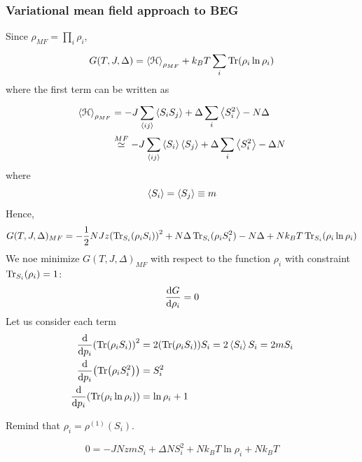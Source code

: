 \documentclass[../main/main.tex]{subfiles}
\begin{document}
\subsubsection{Variational mean field approach to BEG}
Since \( \rho _{MF} = \prod_{i}^{} \rho _i   \),
\begin{equation}
  G(T,J,\Delta ) = \expval{\mathcal{H}}_{\rho _{MF}} + k_B T \sum_{i}^{} \Tr(\rho _i \ln{\rho _i } )
\end{equation}
where the first term can be written as
\begin{equation}
\begin{split}
\expval{\mathcal{H}}_{\rho _{MF}}   &= - J \sum_{\expval{ij} }^{} \expval{S_i S_j}  + \Delta \sum_{i}^{} \expval{S_i^2} - N \Delta      \\
& \overset{MF}{\simeq } - J \sum_{\expval{ij} }^{} \expval{S_i} \expval{S_j} + \Delta \sum_{i}^{} \expval{S_i^2} - \Delta N
\end{split}
\end{equation}
where
\begin{equation}
  \expval{S_i} = \expval{S_j} \equiv m
\end{equation}
Hence,
\begin{equation}
  G(T,J, \Delta )_{MF}  = - \frac{1}{2} N J z \qty( \Tr_{S_i}(\rho _i S_i) )^2
  + N \Delta \Tr_{S_i}(\rho _i S_i^2) - N \Delta +
  N k_B T \Tr_{S_i}(\rho _i \ln{\rho _i} )
\end{equation}
We noe minimize \( G(T,J,\Delta )_{MF} \) with respect to the function \( \rho _i \) with constraint \( \Tr_{S_i}(\rho _i) = 1  \):
\begin{equation}
  \dv{G}{\rho _i} = 0
\end{equation}
Let us consider each term
\begin{subequations}
\begin{align}
  \dv{}{p_i} \qty(\Tr(\rho _i S_i) )^2& = 2 \qty(\Tr(\rho _i S_i) ) S_i = 2 \expval{S_i} S_i = 2 m S_i \\
    \dv{}{p_i} \qty(\Tr(\rho _i S_i^2) ) &= S_i^2 \\
      \dv{}{p_i} \qty(\Tr(\rho _i \ln{\rho _i} ) ) &=  \ln{\rho _i }  +1
\end{align}
\end{subequations}
\begin{remark} Remind that
\( \rho _i = \rho ^{(1)} (S_i) \).
\end{remark}
\begin{equation}
  0 = - J N z m S_i + \Delta N S_i^2 + N k_B T \ln{\rho _i} + N k_B T
\end{equation}
\end{document}
